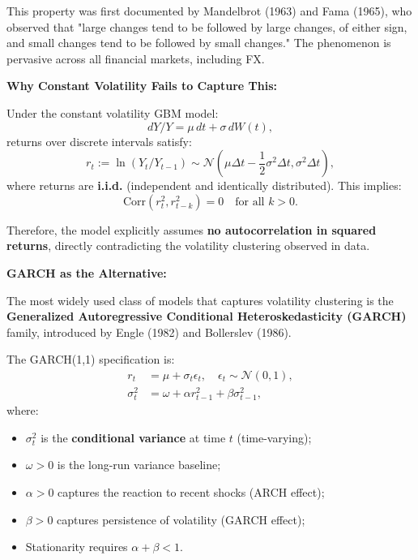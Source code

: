 This property was first documented by Mandelbrot (1963) and Fama (1965), who observed that "large changes tend to be followed by large changes, of either sign, and small changes tend to be followed by small changes." The phenomenon is pervasive across all financial markets, including FX.

\textbf{Why Constant Volatility Fails to Capture This:}

Under the constant volatility GBM model:
\begin{equation}
	dY/Y = \mu \, dt + \sigma \, dW(t),
\end{equation}
returns over discrete intervals satisfy:
\begin{equation}
	r_t := \ln(Y_t/Y_{t-1}) \sim \mathcal{N}(\mu \Delta t - \frac{1}{2}\sigma^2 \Delta t, \sigma^2 \Delta t),
\end{equation}
where returns are \textbf{i.i.d.} (independent and identically distributed). This implies:
\begin{equation}
	\text{Corr}(r_t^2, r_{t-k}^2) = 0 \quad \text{for all } k > 0.
\end{equation}

Therefore, the model explicitly assumes \textbf{no autocorrelation in squared returns}, directly contradicting the volatility clustering observed in data.

\textbf{GARCH as the Alternative:}

The most widely used class of models that captures volatility clustering is the \textbf{Generalized Autoregressive Conditional Heteroskedasticity (GARCH)} family, introduced by Engle (1982) and Bollerslev (1986).

The GARCH(1,1) specification is:
\begin{align}
	r_t &= \mu + \sigma_t \epsilon_t, \quad \epsilon_t \sim \mathcal{N}(0,1), \\
	\sigma_t^2 &= \omega + \alpha r_{t-1}^2 + \beta \sigma_{t-1}^2,
\end{align}
where:
\begin{itemize}
	\item $\sigma_t^2$ is the \textbf{conditional variance} at time $t$ (time-varying);
	\item $\omega > 0$ is the long-run variance baseline;
	\item $\alpha > 0$ captures the reaction to recent shocks (ARCH effect);
	\item $\beta > 0$ captures persistence of volatility (GARCH effect);
	\item Stationarity requires $\alpha + \beta < 1$.
\end{itemize}

